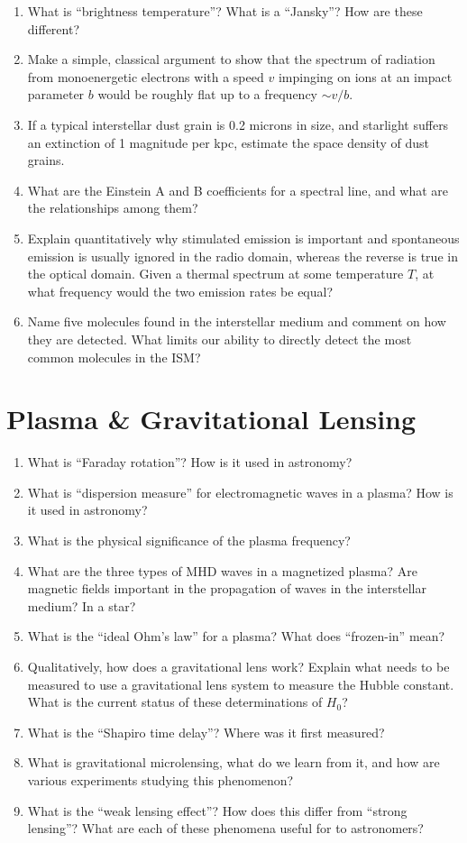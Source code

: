 \documentclass[11pt, oneside]{book}
\begin{document}
\begin{enumerate}[start=72, itemsep=0.4cm]
    \item What is ``brightness temperature''? What is a ``Jansky''? How are these different?
    \item Make a simple, classical argument to show that the spectrum of radiation from monoenergetic electrons with a speed $v$ impinging on ions at an impact parameter $b$ would be roughly flat up to a frequency $\sim v/b$.
    \item If a typical interstellar dust grain is 0.2 microns in size, and starlight suffers an extinction of 1 magnitude per kpc, estimate the space density of dust grains.
    \item What are the Einstein A and B coefficients for a spectral line, and what are the relationships among them?
    \item Explain quantitatively why stimulated emission is important and spontaneous emission is usually ignored in the radio domain, whereas the reverse is true in the optical domain. Given a thermal spectrum at some temperature $T$, at what frequency would the two emission rates be equal?
    \item Name five molecules found in the interstellar medium and comment on how they are detected. What limits our ability to directly detect the most common molecules in the ISM?
\end{enumerate}

\section{Plasma \& Gravitational Lensing}

\begin{enumerate}[start=91, itemsep=0.4cm]
    \item What is ``Faraday rotation''? How is it used in astronomy?
    \item What is ``dispersion measure'' for electromagnetic waves in a plasma? How is it used in astronomy?
    \item What is the physical significance of the plasma frequency?
    \item What are the three types of MHD waves in a magnetized plasma? Are magnetic fields important in the propagation of waves in the interstellar medium? In a star?
    \item What is the ``ideal Ohm's law'' for a plasma? What does ``frozen-in'' mean?
    \item Qualitatively, how does a gravitational lens work? Explain what needs to be measured to use a gravitational lens system to measure the Hubble constant. What is the current status of these determinations of $H_{0}$?
    \item What is the ``Shapiro time delay''? Where was it first measured?
    \item What is gravitational microlensing, what do we learn from it, and how are various experiments studying this phenomenon?
    \item What is the ``weak lensing effect''? How does this differ from ``strong lensing''? What are each of these phenomena useful for to astronomers?
\end{enumerate}
\end{document}
